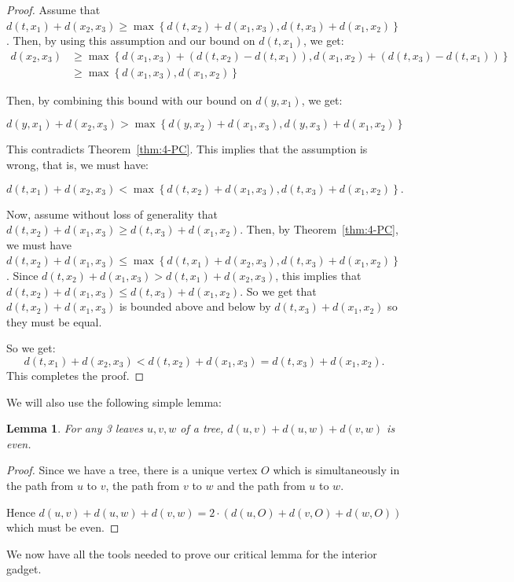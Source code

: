 \documentclass[11pt,letter]{article}
\newtheorem{lemma}[theorem]{Lemma}
\theoremstyle{remark}
\newcommand{\set}[1]{\left\{#1\right\}}
\begin{document}
\begin{proof}
    Assume that $d(t,x_1)+d(x_2,x_3)\geq \max\set{d(t,x_2)+d(x_1,x_3),d(t,x_3)+d(x_1,x_2)}$. Then, by using this assumption and our bound on $d(t,x_1)$, we get:
    \begin{align*}
        d(x_2,x_3)&\geq \max\set{d(x_1,x_3)+(d(t,x_2)-d(t,x_1)),d(x_1,x_2)+(d(t,x_3)-d(t,x_1))}\\
        &\geq \max\set{d(x_1,x_3),d(x_1,x_2)}
    \end{align*}

    Then, by combining this bound with our bound on $d(y,x_1)$, we get:

    \[d(y,x_1)+d(x_2,x_3)>\max\set{d(y,x_2)+d(x_1,x_3),d(y,x_3)+d(x_1,x_2)}\]

    This contradicts Theorem~\ref{thm:4-PC}. This implies that the assumption is wrong, that is, we must have:

    \[d(t,x_1)+d(x_2,x_3)<\max\set{d(t,x_2)+d(x_1,x_3),d(t,x_3)+d(x_1,x_2)}.\]
    
    Now, assume without loss of generality that $d(t,x_2)+d(x_1,x_3)\geq d(t,x_3)+d(x_1,x_2)$. Then, by Theorem~\ref{thm:4-PC}, we must have $d(t,x_2)+d(x_1,x_3)\leq \max\set{d(t,x_1)+d(x_2,x_3),d(t,x_3)+d(x_1,x_2)}$. Since $d(t,x_2)+d(x_1,x_3)>d(t,x_1)+d(x_2,x_3)$, this implies that $d(t,x_2)+d(x_1,x_3)\leq d(t,x_3)+d(x_1,x_2)$. So we get that $d(t,x_2)+d(x_1,x_3)$ is bounded above and below by $d(t,x_3)+d(x_1,x_2)$ so they must be equal. 
    
    So we get:
    \[d(t,x_1)+d(x_2,x_3)<d(t,x_2)+d(x_1,x_3)=d(t,x_3)+d(x_1,x_2).\]
    This completes the proof.
\end{proof}

We will also use the following simple lemma:

\begin{lemma}\label{lem:even}
    For any 3 leaves $u,v,w$ of a tree, $d(u,v)+d(u,w)+d(v,w)$ is even.
\end{lemma}

\begin{proof}
    Since we have a tree, there is a unique vertex $O$ which is simultaneously in the path from $u$ to $v$, the path from $v$ to $w$ and the path from $u$ to $w$. 
    
   Hence $d(u,v)+d(u,w)+d(v,w)=2\cdot (d(u,O)+d(v,O)+d(w,O))$ which must be even. 
\end{proof}

We now have all the tools needed to prove our critical lemma for the interior gadget.
\end{document}
